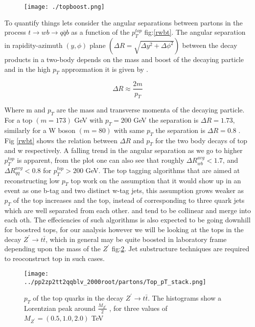 \documentclass[12pt,a4paper]{article}		%
\begin{document}
 	\begin{figure}[h]
 		\begin{centering}	
 			\texttt{[image: ./topboost.png]} 
 			\caption{}
 			\label{boost}
 			\centering
 		\end{centering} 		
 	\end{figure}   

To quantify things lets consider the angular separations between partons in the process $ t \to w b \to q \bar{q} b$ as a function of the $p_T^{top}$ fig:\ref{rwbt}. The angular separation in rapidity-azimuth $(y, \phi)$ plane $\left(  \Delta R = \sqrt{\Delta y^2 + \Delta \phi^2} \right)$ between the decay products  in a two-body depends on the mass and boost of the decaying particle and in the high $p_T$ approzmation it is given by .

\begin{equation}
 \Delta R \approx \frac{2m}{p_T}
\end{equation} 

Where m and $p_T$ are the mass and transverse momenta of the decaying particle. For a top $(m = 173)$ GeV \cite{pdg-top} with $p_T = 200$ GeV the separation is $\Delta R = 1.73 $, similarly for a W boson $(m = 80)$ \cite{pdg-w} with same $p_T$ the separation is $\Delta R = 0.8$ . Fig \ref{rwbt} shows the relation between $\Delta R $ and $p_T$ for the two body decays of top and w respectively. A falling trend in the angular separation as we go to higher $p_T^{top}$  is apparent, from the plot one can also see that roughly $\Delta R_{wb}^{avg} < 1.7$, and $\Delta R_{qq}^{avg}< 0.8 $ for $p_T^{top} > 200$ GeV. The top tagging algorithms that are aimed at reconstructing low $p_T$ top work on the assumption that it would show up in an event as one b-tag and two distinct w-tag jets, this assumption grows weaker as $p_T$ of the top increases and the top, instead of corresponding to three quark jets which are well separated from each other.  and tend to be collinear and merge into each oth. The effeciencies of such algorithms is also expected to be going downhill for boostred tops, for our analysis however we will be looking at the tops in the decay $Z^\prime \to t \bar{t}$, which in general may be quite boosted in laboratory frame depending upon the mass of the $Z^\prime$ fig:\ref{toppt}. Jet substructure techniques are required to reoconstruct top in such cases.  
   

 	\begin{figure}[h]
	\begin{centering}	
		\texttt{[image: ../pp2zp2tt2qqblv\_2000root/partons/Top\_pT\_stack.png]} 
		\caption{ $p_T$ of the top quarks in the decay $ Z^\prime \to t \bar{t}$. The histograms show a Lorentzian peak around $\frac{M_{Z^\prime}}{2}$ , for three values of $M_{Z^\prime} = (0.5,1.0 ,2.0)$ TeV}
		\label{toppt}
		\centering
	\end{centering} 		
\end{figure}   
\end{document}
